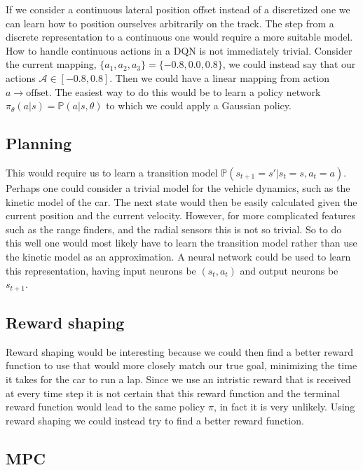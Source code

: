 \documentclass{article}
\begin{document}
If we consider a continuous lateral position offset instead of a discretized one we can learn how to position ourselves arbitrarily on the track. The step from a discrete representation to a continuous one would require a more suitable model. How to handle continuous actions in a DQN is not immediately trivial.  Consider the current mapping, $\{a_1,a_2,a_3\} = \{-0.8, 0.0, 0.8\}$, we could instead say that our actions $\mathcal{A} \in [-0.8,0.8]$. Then we could have a linear mapping from action $a \rightarrow \text{offset}$. The easiest way to do this would be to learn a policy network $\pi_\theta(a|s) = \mathbb{P}(a | s, \theta)$ to which we could apply a Gaussian policy.

\subsection{Planning}

This would require us to learn a transition model  $\mathbb{P}(s_{t+1}=s'|s_t=s,a_t=a)$. Perhaps one could consider a trivial model for the vehicle dynamics, such as the kinetic model of the car. The next state would then be easily calculated given the current position and the current velocity. However, for more complicated features such as the range finders, and the radial sensors this is not so trivial. So to do this well one would most likely have to learn the transition model rather than use the kinetic model as an approximation. A neural network could be used to learn this representation, having input neurons be $(s_t,a_t)$ and output neurons be $s_{t+1}$.

\subsection{Reward shaping}

Reward shaping would be interesting because we could then find a better reward function to use that would more closely match our true goal, minimizing the time it takes for the car to run a lap. Since we use an intristic reward that is received at every time step it is not certain that this reward function and the terminal reward function would lead to the same policy $\pi$, in fact it is very unlikely. Using reward shaping we could instead try to find a better reward function.

\subsection{MPC}
\end{document}
